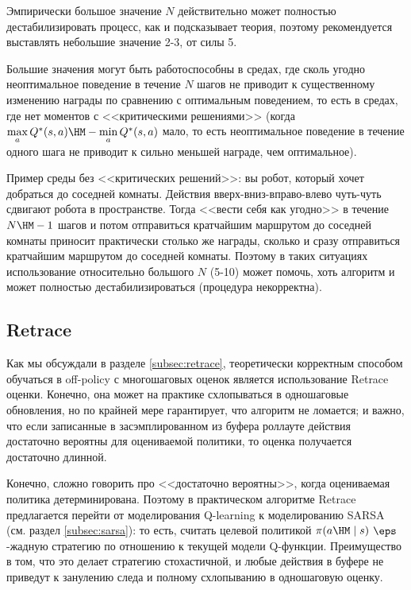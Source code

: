 \begin{remark}
Эмпирически большое значение $N$ действительно может полностью дестабилизировать процесс, как и подсказывает теория, поэтому рекомендуется выставлять небольшие значение 2-3, от силы 5. 
\end{remark}

Большие значения могут быть работоспособны в средах, где сколь угодно неоптимальное поведение в течение $N$ шагов не приводит к существенному изменению награды по сравнению с оптимальным поведением, то есть в средах, где нет моментов с <<критическими решениями>> (когда $\max\limits_a Q^*(s, a) \HM- \min\limits_a Q^*(s, a)$ мало, то есть неоптимальное поведение в течение одного шага не приводит к сильно меньшей награде, чем оптимальное).

\begin{example}
Пример среды без <<критических решений>>: вы робот, который хочет добраться до соседней комнаты. Действия вверх-вниз-вправо-влево чуть-чуть сдвигают робота в пространстве. Тогда <<вести себя как угодно>> в течение $N \HM- 1$ шагов и потом отправиться кратчайшим маршрутом до соседней комнаты приносит практически столько же награды, сколько и сразу отправиться кратчайшим маршрутом до соседней комнаты. Поэтому в таких ситуациях использование относительно большого $N$ (5-10) может помочь, хоть алгоритм и может полностью дестабилизироваться (процедура некорректна).
\end{example}

\subsection{Retrace}

Как мы обсуждали в разделе \ref{subsec:retrace}, теоретически корректным способом обучаться в off-policy с многошаговых оценок является использование Retrace оценки. Конечно, она может на практике схлопываться в одношаговые обновления, но по крайней мере гарантирует, что алгоритм не ломается; и важно, что если записанные в засэмплированном из буфера роллауте действия достаточно вероятны для оцениваемой политики, то оценка получается достаточно длинной.

Конечно, сложно говорить про <<достаточно вероятны>>, когда оцениваемая политика детерминирована. Поэтому в практическом алгоритме Retrace предлагается перейти от моделирования Q-learning к моделированию SARSA (см. раздел \ref{subsec:sarsa}): то есть, считать целевой политикой $\pi(a \HM \mid s)$ $\eps$-жадную стратегию по отношению к текущей модели Q-функции. Преимущество в том, что это делает стратегию стохастичной, и любые действия в буфере не приведут к занулению следа и полному схлопыванию в одношаговую оценку.

